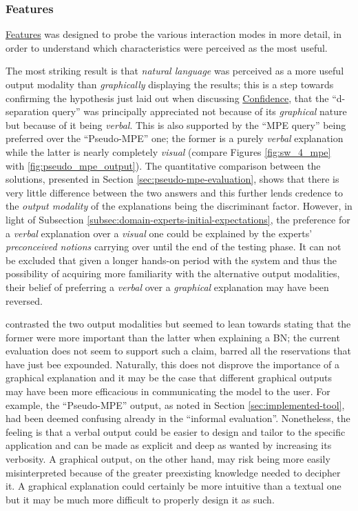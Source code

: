 \subsubsection{Features}
\hyperref[ques:features]{Features} was designed to probe the various interaction modes in more detail, in order to understand which characteristics were perceived as the most useful.

The most striking result is that \textit{natural language} was perceived as a more useful output modality than \textit{graphically} displaying the results; this is a step towards confirming the hypothesis just laid out when discussing \hyperref[ques:confidence]{Confidence}, that the \enquote{d-separation query} was principally appreciated not because of its \textit{graphical} nature but because of it being \textit{verbal}.
This is also supported by the \enquote{MPE query} being preferred over the \enquote{Pseudo-MPE} one; the former is a purely \textit{verbal} explanation while the latter is nearly completely \textit{visual} (compare Figures \ref{fig:sw_4_mpe} with \ref{fig:pseudo_mpe_output}).
The quantitative comparison between the solutions, presented in Section \ref{sec:pseudo-mpe-evaluation}, shows that there is very little difference between the two answers and this further lends credence to the \textit{output modality} of the explanations being the discriminant factor.
However, in light of Subsection \ref{subsec:domain-experts-initial-expectations}, the preference for a \textit{verbal} explanation over a \textit{visual} one could be explained by the experts' \textit{preconceived notions} carrying over until the end of the testing phase.
It can not be excluded that given a longer hands-on period with the system and thus the possibility of acquiring more familiarity with the alternative output modalities, their belief of preferring a \textit{verbal} over a \textit{graphical} explanation may have been reversed.

\citet{lacave2002review} contrasted the two output modalities but seemed to lean towards stating that the former were more important than the latter when explaining a BN; the current evaluation does not seem to support such a claim, barred all the reservations that have just bee expounded.
Naturally, this does not disprove the importance of a graphical explanation and it may be the case that different graphical outputs may have been more efficacious in communicating the model to the user.
For example, the \enquote{Pseudo-MPE} output, as noted in Section \ref{sec:implemented-tool}, had been deemed confusing already in the \enquote{informal evaluation}.
Nonetheless, the feeling is that a verbal output could be easier to design and tailor to the specific application and can be made as explicit and deep as wanted by increasing its verbosity.
A graphical output, on the other hand, may risk being more easily misinterpreted because of the greater preexisting knowledge needed to decipher it.
A graphical explanation could certainly be more intuitive than a textual one but it may be much more difficult to properly design it as such.


